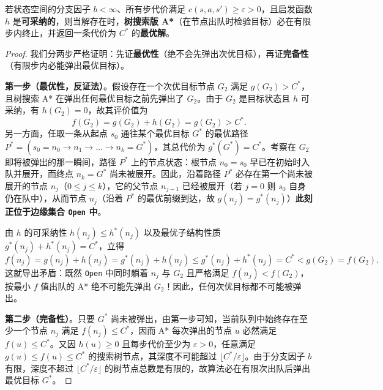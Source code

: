 \begin{thmBox}
\begin{theorem}\label{thm:astar-tree}
若状态空间的分支因子 $b < \infty$、所有步代价满足 $c(s,a,s')\ge \varepsilon > 0$，且启发函数 $h$ 是\textbf{可采纳的}，则当解存在时，\textbf{树搜索版 A*}（在节点出队时检验目标）必在有限步内终止，并返回一条代价为 $C^*$ 的\textbf{最优解}。
\end{theorem}
\end{thmBox}

\begin{proof}
我们分两步严格证明：先证\textbf{最优性}（绝不会先弹出次优目标），再证\textbf{完备性}（有限步内必能弹出最优目标）。

\textbf{第一步（最优性，反证法）}。假设存在一个次优目标节点 $G_2$ 满足 $g(G_2) > C^*$，且树搜索 A* 在弹出任何最优目标之前先弹出了 $G_2$。由于 $G_2$ 是目标状态且 $h$ 可采纳，有 $h(G_2) = 0$，故其评价值为
\[
  f(G_2) = g(G_2) + h(G_2) = g(G_2) > C^*.
\]
另一方面，任取一条从起点 $s_0$ 通往某个最优目标 $G^*$ 的最优路径 $P^* = (s_0 = n_0 \to n_1 \to \dots \to n_k = G^*)$，其总代价为 $g^*(G^*) = C^*$。考察在 $G_2$ 即将被弹出的那一瞬间，路径 $P^*$ 上的节点状态：根节点 $n_0=s_0$ 早已在初始时入队并展开，而终点 $n_k=G^*$ 尚未被展开。因此，沿着路径 $P^*$ 必存在第一个尚未被展开的节点 $n_j$（$0 \le j \le k$），它的父节点 $n_{j-1}$ 已经被展开（若 $j=0$ 则 $s_0$ 自身仍在队中），从而节点 $n_j$（沿着 $P^*$ 的最优前缀到达，故 $g(n_j) = g^*(n_j)$）\textbf{此刻正位于边缘集合 \texttt{Open} 中}。

由 $h$ 的可采纳性 $h(n_j) \le h^*(n_j)$ 以及最优子结构性质 $g^*(n_j) + h^*(n_j) = C^*$，立得
\begin{equation}\label{eq:astar-proof-key}
  f(n_j) = g(n_j) + h(n_j) = g^*(n_j) + h(n_j) \le g^*(n_j) + h^*(n_j) = C^* < g(G_2) = f(G_2).
\end{equation}
这就导出矛盾：既然 \texttt{Open} 中同时躺着 $n_j$ 与 $G_2$ 且严格满足 $f(n_j) < f(G_2)$，按最小 $f$ 值出队的 A* 绝不可能先弹出 $G_2$！因此，任何次优目标都不可能被弹出。

\textbf{第二步（完备性）}。只要 $G^*$ 尚未被弹出，由第一步可知，当前队列中始终存在至少一个节点 $n_j$ 满足 $f(n_j) \le C^*$，因而 A* 每次弹出的节点 $u$ 必然满足 $f(u) \le C^*$。又因 $h(u)\ge 0$ 且每步代价至少为 $\varepsilon > 0$，任意满足 $g(u) \le f(u) \le C^*$ 的搜索树节点，其深度不可能超过 $\lfloor C^*/\varepsilon \rfloor$。由于分支因子 $b$ 有限，深度不超过 $\lfloor C^*/\varepsilon \rfloor$ 的树节点总数是有限的，故算法必在有限次出队后弹出最优目标 $G^*$。
\end{proof}

